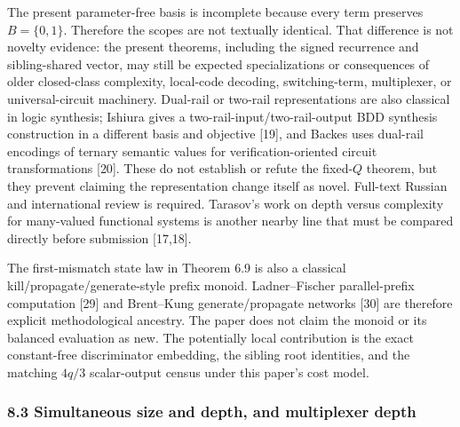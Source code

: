 \documentclass[
  11pt,
]{article}
\theoremstyle{definition}
\theoremstyle{remark}
\begin{document}
The present parameter-free basis is incomplete because every term
preserves \(B=\{0,1\}\). Therefore the scopes are not textually
identical. That difference is not novelty evidence: the present
theorems, including the signed recurrence and sibling-shared vector, may
still be expected specializations or consequences of older closed-class
complexity, local-code decoding, switching-term, multiplexer, or
universal-circuit machinery. Dual-rail or two-rail representations are
also classical in logic synthesis; Ishiura gives a
two-rail-input/two-rail-output BDD synthesis construction in a different
basis and objective {[}19{]}, and Backes uses dual-rail encodings of
ternary semantic values for verification-oriented circuit
transformations {[}20{]}. These do not establish or refute the
fixed-\(Q\) theorem, but they prevent claiming the representation change
itself as novel. Full-text Russian and international review is required.
Tarasov's work on depth versus complexity for many-valued functional
systems is another nearby line that must be compared directly before
submission {[}17,18{]}.

The first-mismatch state law in Theorem 6.9 is also a classical
kill/propagate/generate-style prefix monoid. Ladner--Fischer
parallel-prefix computation {[}29{]} and Brent--Kung generate/propagate
networks {[}30{]} are therefore explicit methodological ancestry. The
paper does not claim the monoid or its balanced evaluation as new. The
potentially local contribution is the exact constant-free discriminator
embedding, the sibling root identities, and the matching \(4q/3\)
scalar-output census under this paper's cost model.

\hypertarget{simultaneous-size-and-depth-and-multiplexer-depth}{%
\subsubsection{8.3 Simultaneous size and depth, and multiplexer
depth}\label{simultaneous-size-and-depth-and-multiplexer-depth}}
\end{document}
